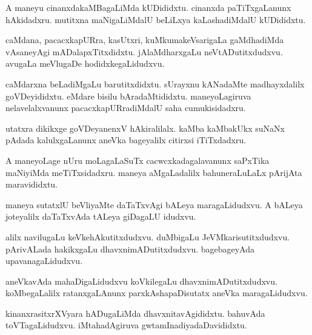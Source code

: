 \documentclass{article}
\begin{document}
\begin{mn}
A  maneyu  cinanxdakaMBagaLiMda  kUDididxtu.  cinanxda  paTiTxgaLanunx  hAkidadxru.  mutitxna  maNigaLiMdalU  beLiLxya  
kaLashadiMdalU  kUDididxtu.  
\end{mn}

\begin{mn}
caMdana,  pacacxkapURra,  kasUtxri,  kuMkumakeVsarigaLa  gaMdhadiMda  vAsaneyAgi  mADalapxTitxdidxtu.  jAlaMdharxgaLu  neVtADutitxdudxvu.  
avugaLa  meVlugaDe  hodidxkegaLidudxvu.
\end{mn}

\begin{mn}
caMdarxna  beLadiMgaLu  barutitxdidxtu.  sUrayxnu  kANadaMte  madhayxdalilx  goVDeyididxtu.  eMdare  bisilu  bAradaMtididxtu.  
maneyoLagiruva  nelavelalxvanunx  pacacxkapURradiMdalU  saha  cumukisidadxru.
\end{mn}

\begin{mn}
utatxra  dikikxge  goVDeyanenxV  hAkiralilalx.  kaMba kaMbakUkx  suNaNx  pAdada  kalulxgaLanunx  aneVka bageyalilx  citirxsi  iTiTxdadxru.
\end{mn}

\begin{mn}
A  maneyoLage  nUru  moLagaLaSuTx  cacwcxkadagalavanunx  saPxTika  maNiyiMda  meTiTxsidadxru.  maneya  aMgaLadalilx  bahuneraLuLaLx  
pArijAta  maravididxtu.
\end{mn}

\begin{mn}
maneya  sutatxlU  beVliyaMte  daTaTxvAgi  bALeya  maragaLidudxvu.  A  bALeya  joteyalilx  daTaTxvAda  tALeya  giDagaLU  idudxvu.
\end{mn}

\begin{mn}
alilx  navilugaLu  keVkehAkutitxdudxvu.  duMbigaLu  JeVMkarisutitxdudxvu.  pArivALada  hakikxgaLu  dhavxnimADutitxdudxvu.  
bagebageyAda  upavanagaLidudxvu.
\end{mn}

\begin{mn}
aneVkavAda  mahaDigaLidudxvu  koVkilegaLu  dhavxnimADutitxdudxvu.  koMbegaLalilx  ratanxgaLAnunx  parxkAshapaDisutatx  
aneVka  maragaLidudxvu.  
\end{mn}

\begin{mn}
kinanxrasitxrXVyara  hADugaLiMda  dhavxnitavAgididxtu.  bahuvAda  toVTagaLidudxvu.  iMtahadAgiruva  gwtamInadiyadaDavididxtu.
\end{mn}
\end{document}
